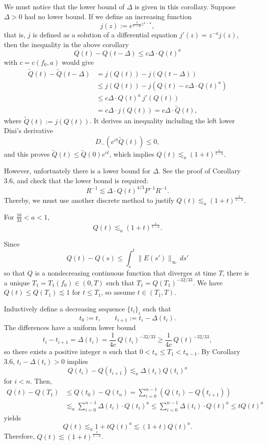\documentclass{article}
\begin{document}
\begin{rmk}
We must notice that the lower bound of $\Delta$ is given in this corollary.
Suppose $\Delta>0$ had no lower bound.
If we define an increasing function
\[j(z):=e^{\frac1{1-a}z^{1-a}},\]
that is, $j$ is defined as a solution of a differential equation $j'(z)=z^{-a}j(z)$, then the inequality in the above corollary
\[Q(t)-Q(t-\Delta)\le c\Delta\cdot Q(t)^a\]
with $c=c(f_0,a)$ would give
\begin{align*}
\tilde Q(t)-\tilde Q(t-\Delta)
&=j(Q(t))-j(Q(t-\Delta))\\
&\le j(Q(t))-j(Q(t)-c\Delta\cdot Q(t)^a)\\
&\le c\Delta\cdot Q(t)^a\ j'(Q(t))\\
&=c\Delta\cdot j(Q(t))=c\Delta\cdot\tilde Q(t),
\end{align*}
where $\tilde Q(t):=j(Q(t))$.
It derives an inequality including the left lower Dini's derivative
\[D_-(e^{ct}\tilde Q(t))\le0,\]
and this proves $\tilde Q(t)\le\tilde Q(0)e^{ct}$, which implies $Q(t)\lesssim_a(1+t)^{\frac1{1-a}}$.

However, unfortuately there is a lower bound for $\Delta$.
See the proof of Corollary 3.6, and check that the lower bound is required:
\[R^{-1}\lesssim\Delta\cdot Q(t)^{4/3}P^{-1}R^{-1}.\]
Thereby, we must use another discrete method to justify $Q(t)\lesssim_a(1+t)^{\frac1{1-a}}$.
\end{rmk}

\begin{thm*}
For $\frac{16}{33}<a<1$,
\[Q(t)\lesssim_a(1+t)^{\frac1{1-a}}.\]
\end{thm*}
\begin{pf}
Since
\[Q(t)-Q(s)\le\int_s^t\|E(s')\|_\infty\,ds'\]
so that $Q$ is a nondecreasing continuous function that diverges at time $T$, there is a unique $T_1=T_1(f_0)\in(0,T)$ such that $T_1=Q(T_1)^{-32/33}$.
We have $Q(t)\le Q(T_1)\lesssim1$ for $t\le T_1$, so assume $t\in(T_1,T)$.

Inductively define a decreasing sequence $\{t_i\}_i$ such that
\[t_0:=t,\qquad t_{i+1}:=t_i-\Delta(t_i).\]
The differences have a uniform lower bound
\[t_i-t_{i+1}=\Delta(t_i)=\frac1{4c}\,Q(t_i)^{-32/33}\ge\frac1{4c}\,Q(t)^{-32/33},\]
so there exists a positive integer $n$ such that $0<t_n\le T_1<t_{n-1}$.
By Corollary 3.6, $t_i-\Delta(t_i)>0$ implies
\[Q(t_i)-Q(t_{i+1})\lesssim_a\Delta(t_i)Q(t_i)^a\]
for $i<n$.
Then,
\begin{align*}
Q(t)-Q(T_1)&\le Q(t_0)-Q(t_n)
=\sum_{i=0}^{n-1}(Q(t_i)-Q(t_{i+1}))\\
&\lesssim_a\sum_{i=0}^{n-1}\Delta(t_i)\cdot Q(t_i)^a
\le\sum_{i=0}^{n-1}\Delta(t_i)\cdot Q(t)^a
\le tQ(t)^a
\end{align*}
yields
\[Q(t)\lesssim_a1+tQ(t)^a\lesssim(1+t)Q(t)^a.\]
Therefore, $Q(t)\lesssim(1+t)^{\frac1{1-a}}$.
\end{pf}




\end{document}
